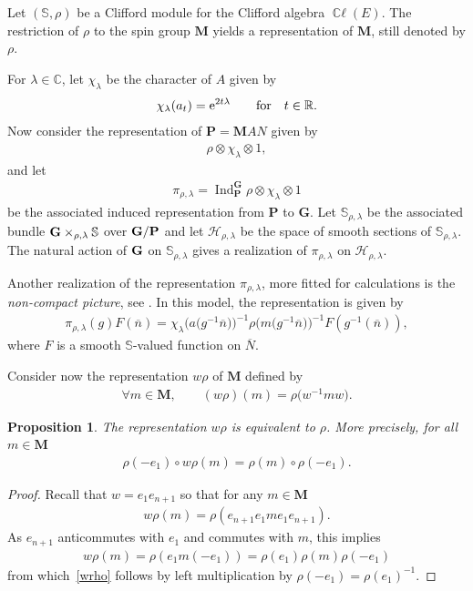 \documentclass[10pt,a4paper]{amsart}
\DeclareMathOperator{\ccl}{\mathbb{C}\ell} %
\DeclareMathOperator{\Ind}{Ind}
\numberwithin{equation}{section}
\newtheorem{prop}[theor]{Proposition}
\begin{document}
Let $(\mathbb S, \rho)$ be a Clifford module for the Clifford algebra $\ccl(E)$. The restriction of $\rho$ to the spin group $\mathbf M$ yields a representation of $\mathbf M$, still denoted by $\rho$.

For $\lambda\in \mathbb C$, let $\chi_\lambda$ be the character of $A$ given by
\begin{gather*}
\chi_\lambda(a_t) = {\rm e}^{2t\lambda}\qquad \text {for}\quad t\in \mathbb R .
\end{gather*}
Now consider the representation
 of $\mathbf P= \mathbf M AN$ given by
\begin{gather*}
\rho\otimes \chi_\lambda\otimes 1,
\end{gather*}
and let
\begin{gather*}
\pi_{\rho,\lambda} = \Ind_{\mathbf P}^{\mathbf G} \rho\otimes \chi_\lambda\otimes 1
\end{gather*}
be the associated induced representation from $\mathbf P$ to $\mathbf G$. Let $\mathbb S_{\rho, \lambda}$ be the associated bundle $\bf G\times_{\rho,\lambda} \mathbb S$ over $\bf G/\bf P$ and let $\mathcal H_{\rho, \lambda}$ be the space of smooth sections of $ \mathbb S_{\rho, \lambda}$. The natural action of $\bf G$ on $\mathbb S_{\rho, \lambda}$
gives a realization of $\pi_{\rho, \lambda}$ on $\mathcal H_{\rho, \lambda}$.

Another realization of the representation $\pi_{\rho, \lambda}$, more fitted for calculations is the \emph{non-compact picture}, see \cite[Chapter VII]{kn}. In this model, the representation is given by
\begin{gather*}
\pi_{\rho,\lambda} (g) F (\overline n) = {\chi_\lambda\big(a\big(g^{-1}\overline n\big)\big)^{-1}} \rho\big(m\big(g^{-1}\overline n\big)\big)^{-1} F\left(g^{-1}(\overline n)\right)\!,
\end{gather*}
where $F$ is a smooth $\mathbb S$-valued function on $\overline N$.

Consider now the representation $w\rho$ of $\mathbf M$ defined by
\begin{gather*}
\forall m\in \mathbf M,\qquad (w\rho)(m) = \rho\big(w^{-1} m w\big) .
\end{gather*}
\begin{prop} \label{wrhoeqrho}
The representation $w \rho$ is equivalent to $ \rho$. More precisely, for all $m\in \mathbf M$
\begin{gather}\label{wrho}
 \rho(-e_1)\circ w \rho(m) = \rho(m)\circ \rho(-e_1) .
\end{gather}
\end{prop}
\begin{proof}
Recall that $w=e_1e_{n+1}$ so that for any $m\in \mathbf M$
\begin{gather*}
w\rho(m) = \rho(e_{n+1} e_1me_1 e_{n+1}) .
\end{gather*}
As $e_{n+1}$ anticommutes with $e_1$ and commutes with $m$, this implies
\begin{gather*}
w\rho(m) = \rho(e_1m(-e_1))= \rho(e_1) \rho(m) \rho(-e_1)\end{gather*}
from which~\eqref{wrho} follows by left multiplication by $ \rho(-e_1)= \rho(e_1)^{-1}$.
\end{proof}
\end{document}
